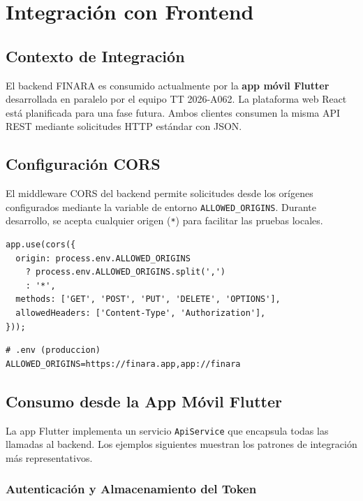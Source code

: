 \chapter{Integración con Frontend}

\section{Contexto de Integración}

El backend FINARA es consumido actualmente por la \textbf{app móvil Flutter} desarrollada en paralelo por el equipo TT 2026-A062. La plataforma web React está planificada para una fase futura. Ambos clientes consumen la misma API REST mediante solicitudes HTTP estándar con JSON.

\section{Configuración CORS}

El middleware CORS del backend permite solicitudes desde los orígenes configurados mediante la variable de entorno \texttt{ALLOWED\_ORIGINS}. Durante desarrollo, se acepta cualquier origen (\texttt{*}) para facilitar las pruebas locales.

\begin{lstlisting}[style=javascript, caption={Configuración CORS en app.js}]
app.use(cors({
  origin: process.env.ALLOWED_ORIGINS
    ? process.env.ALLOWED_ORIGINS.split(',')
    : '*',
  methods: ['GET', 'POST', 'PUT', 'DELETE', 'OPTIONS'],
  allowedHeaders: ['Content-Type', 'Authorization'],
}));
\end{lstlisting}

\begin{lstlisting}[style=bash, caption={Variable de entorno para producción}]
# .env (produccion)
ALLOWED_ORIGINS=https://finara.app,app://finara
\end{lstlisting}

\section{Consumo desde la App Móvil Flutter}

La app Flutter implementa un servicio \texttt{ApiService} que encapsula todas las llamadas al backend. Los ejemplos siguientes muestran los patrones de integración más representativos.

\subsection{Autenticación y Almacenamiento del Token}

